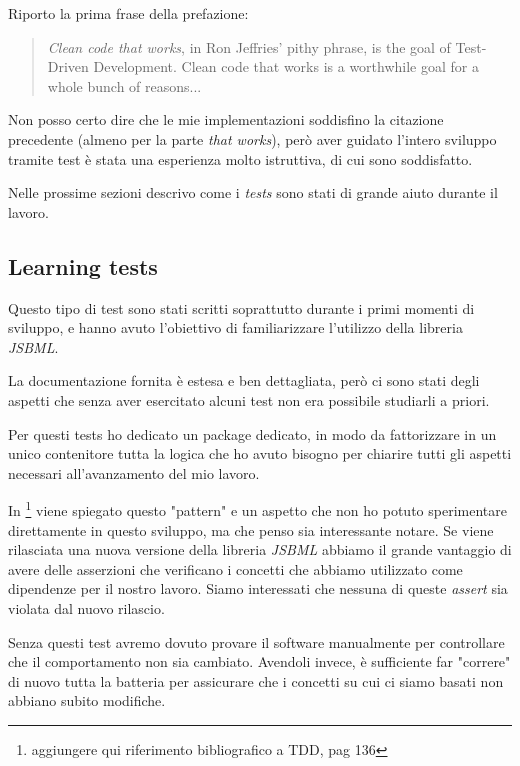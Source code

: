 Riporto la prima frase della prefazione:
\begin{quotation}
  \emph{Clean code that works}, in Ron Jeffries' pithy phrase, is the
  goal of Test-Driven Development. Clean code that works is a
  worthwhile goal for a whole bunch of reasons...
\end{quotation}
Non posso certo dire che le mie implementazioni soddisfino la
citazione precedente (almeno per la parte \emph{that works}), per\`o
aver guidato l'intero sviluppo tramite test \`e stata una esperienza
molto istruttiva, di cui sono soddisfatto.

Nelle prossime sezioni descrivo come i \emph{tests} sono stati di
grande aiuto durante il lavoro.

\subsection{Learning tests}
Questo tipo di test sono stati scritti soprattutto durante i primi
momenti di sviluppo, e hanno avuto l'obiettivo di
familiarizzare l'utilizzo della libreria \emph{JSBML}. 

La documentazione fornita \`e estesa e ben dettagliata, per\`o ci
sono stati degli aspetti che senza aver esercitato alcuni test non era
possibile studiarli a priori.

Per questi tests ho dedicato un package dedicato, in modo da
fattorizzare in un unico contenitore tutta la logica che ho avuto
bisogno per chiarire tutti gli aspetti necessari all'avanzamento del
mio lavoro.

In \footnote{aggiungere qui riferimento bibliografico a TDD, pag 136}
viene spiegato questo "pattern" e un aspetto che non ho potuto
sperimentare direttamente in questo sviluppo, ma che penso sia
interessante notare. Se viene rilasciata una nuova versione della
libreria \emph{JSBML} abbiamo il grande vantaggio di avere delle
asserzioni che verificano i concetti che abbiamo utilizzato come
dipendenze per il nostro lavoro. Siamo interessati che nessuna di
queste \emph{assert} sia violata dal nuovo rilascio. 

Senza questi test avremo dovuto provare il software manualmente per
controllare che il comportamento non sia cambiato. Avendoli invece,
\`e sufficiente far "correre" di nuovo tutta la batteria per
assicurare che i concetti su cui ci siamo basati non abbiano subito
modifiche.

